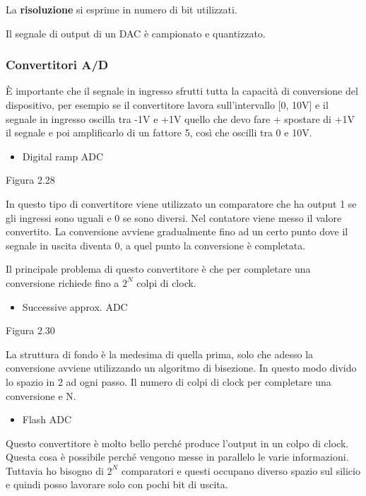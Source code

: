 \documentclass[
]{article}
\providecommand{\tightlist}{%
  \setlength{\itemsep}{0pt}\setlength{\parskip}{0pt}}
\begin{document}
La \textbf{risoluzione} si esprime in numero di bit utilizzati.

Il segnale di output di un DAC è campionato e quantizzato.

\subsubsection{Convertitori A/D}\label{convertitori-ad}

È importante che il segnale in ingresso sfrutti tutta la capacità di
conversione del dispositivo, per esempio se il convertitore lavora
sull'intervallo {[}0, 10V{]} e il segnale in ingresso oscilla tra -1V e
+1V quello che devo fare + spostare di +1V il segnale e poi amplificarlo
di un fattore 5, così che oscilli tra 0 e 10V.

\begin{itemize}
\tightlist
\item
  Digital ramp ADC
\end{itemize}

Figura 2.28

In questo tipo di convertitore viene utilizzato un comparatore che ha
output 1 se gli ingressi sono uguali e 0 se sono diversi. Nel contatore
viene messo il valore convertito. La conversione avviene gradualmente
fino ad un certo punto dove il segnale in uscita diventa 0, a quel punto
la conversione è completata.

Il principale problema di questo convertitore è che per completare una
conversione richiede fino a \(2^{N}\) colpi di clock.

\begin{itemize}
\tightlist
\item
  Successive approx. ADC
\end{itemize}

Figura 2.30

La struttura di fondo è la medesima di quella prima, solo che adesso la
conversione avviene utilizzando un algoritmo di bisezione. In questo
modo divido lo spazio in 2 ad ogni passo. Il numero di colpi di clock
per completare una conversione e N.

\begin{itemize}
\tightlist
\item
  Flash ADC
\end{itemize}

Questo convertitore è molto bello perché produce l'output in un colpo di
clock. Questa cosa è possibile perché vengono messe in parallelo le
varie informazioni. Tuttavia ho bisogno di \(2^{N}\) comparatori e
questi occupano diverso spazio sul silicio e quindi posso lavorare solo
con pochi bit di uscita.
\end{document}
